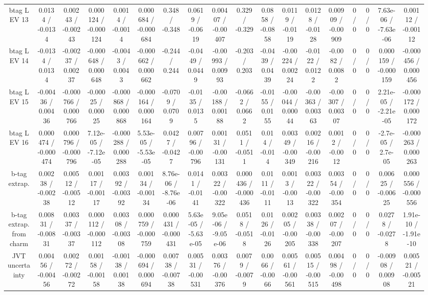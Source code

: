 \documentclass[10pt]{article}
\begin{document}
\begin{table}[htbp]
\begin{center}
\begin{tabular}{|c|c|c|c|c|c|c|c|c|c|c|c|c|c|c|c|c|c|}
  btag L EV 13 & 0.0134 / -0.0134 & 0.00243 / -0.00243 & 0.000124 / -0.000124 & 0.0014 / -0.0014 & 0.000684 / -0.000684 & 0.348 / -0.348 & 0.0619 / -0.0619 & 0.00407 / -0.00407 & 0.329 / -0.329 & 0.0858 / -0.0858 & 0.0119 / -0.0119 & 0.0128 / -0.0128 & 0.00909 / -0.00909 & 0 / 0 & 0 / 0 & 7.63e-06 / -7.63e-06 & 0.00112 / -0.00112 \\ 
  btag L EV 14 & -0.0134 / 0.0134 & -0.00237 / 0.00237 & -0.000648 / 0.000648 & -0.0043 / 0.0043 & -0.000662 / 0.000662 & -0.244 / 0.244 & -0.0449 / 0.0449 & -0.00993 / 0.00993 & -0.203 / 0.203 & -0.0439 / 0.0439 & -0.00224 / 0.00224 & -0.0122 / 0.0122 & -0.0082 / 0.0082 & 0 / 0 & 0 / 0 & 0.000159 / -0.000159 & -0.000456 / 0.000456 \\ 
  btag L EV 15 & -0.00436 / 0.00436 & -0.000766 / 0.000766 & -0.00025 / 0.00025 & -0.000868 / 0.000868 & -0.000164 / 0.000164 & -0.0709 / 0.0709 & -0.0135 / 0.0135 & -0.00188 / 0.00188 & -0.0662 / 0.0662 & -0.0155 / 0.0155 & -0.00044 / 0.00044 & -0.00363 / 0.00363 & -0.00307 / 0.00307 & 0 / 0 & 0 / 0 & 2.21e-05 / -2.21e-05 & -0.000172 / 0.000172 \\ 
  btag L EV 16 & 0.000474 / -0.000474 & 0.000796 / -0.000796 & 7.12e-05 / -7.12e-05 & -0.000288 / 0.000288 & 5.53e-05 / -5.53e-05 & 0.0427 / -0.0427 & 0.00796 / -0.00796 & 0.00131 / -0.00131 & 0.0511 / -0.0511 & 0.014 / -0.014 & 0.00349 / -0.00349 & 0.00216 / -0.00216 & 0.0012 / -0.0012 & 0 / 0 & 0 / 0 & -2.7e-05 / 2.7e-05 & -0.000263 / 0.000263 \\ 
  b-tag extrap. & 0.00238 / -0.00238 & 0.00512 / -0.00512 & 0.00117 / -0.00117 & 0.00392 / -0.00392 & 0.00134 / -0.00134 & 8.76e-06 / -8.76e-06 & 0.0141 / -0.0141 & 0.00322 / -0.00322 & 0.000436 / -0.000436 & 0.0111 / -0.0111 & 0.0013 / -0.0013 & 0.00322 / -0.00322 & 0.00354 / -0.00354 & 0 / 0 & 0 / 0 & 0.00625 / -0.00625 & 0.000556 / -0.000556 \\ 
  b-tag extrap. from charm & 0.00831 / -0.00831 & 0.00337 / -0.00337 & 0.000112 / -0.000112 & 0.00308 / -0.00308 & 0.000759 / -0.000759 & 0.000431 / -0.000431 & 5.63e-05 / -5.63e-05 & 9.05e-06 / -9.05e-06 & 0.0518 / -0.0518 & 0.0126 / -0.0126 & 0.00205 / -0.00205 & 0.00338 / -0.00338 & 0.00207 / -0.00207 & 0 / 0 & 0 / 0 & 0.0278 / -0.0278 & 1.91e-10 / -1.91e-10 \\ 
  JVT uncertainty & 0.00456 / -0.00456 & 0.00272 / -0.00272 & 0.00158 / -0.00158 & -0.00138 / 0.00138 & -0.000694 / 0.000694 & 0.00738 / -0.00738 & 0.00531 / -0.00531 & 0.00376 / -0.00376 & 0.0079 / -0.0079 & 0.0066 / -0.0066 & 0.00561 / -0.00561 & 0.00515 / -0.00515 & 0.00498 / -0.00498 & 0 / 0 & 0 / 0 & -0.00908 / 0.00908 & 0.00521 / -0.00521 \\ 

\end{tabular}
\end{center}
\end{table}
\end{document}
